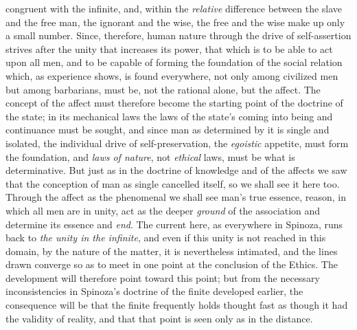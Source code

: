 \documentclass[12pt,a4paper,openany]{book}
\newcommand{\opage}[1]{\marginnote{\footnotesize\textit{[#1]}}}
\begin{document}
\opage{133}congruent with the infinite, and, within the \emph{relative} difference between the slave and the free man, the ignorant and the wise, the free and the wise make up only a small number. Since, therefore, human nature through the drive of self-assertion strives after the unity that increases its power, that which is to be able to act upon all men, and to be capable of forming the foundation of the social relation which, as experience shows, is found everywhere, not only among civilized men but among barbarians, must be, not the rational alone, but the affect. The concept of the affect must therefore become the starting point of the doctrine of the state; in its mechanical laws the laws of the state's coming into being and continuance must be sought, and since man as determined by it is single and isolated, the individual drive of self-preservation, the \emph{egoistic} appetite, must form the foundation, and \emph{laws of nature}, not \emph{ethical} laws, must be what is determinative. But just as in the doctrine of knowledge and of the affects we saw that the conception of man as single cancelled itself, so we shall see it here too. Through the affect as the phenomenal we shall see man's true essence, reason, in which all men are in unity, act as the deeper \emph{ground} of the association and determine its essence and \emph{end}. The current here, as everywhere in Spinoza, runs back to \emph{the unity in the infinite}, and even if this unity is not reached in this domain, by the nature of the matter, it is nevertheless intimated, and the lines drawn converge so as to meet in one point at the conclusion of the Ethics. The development will therefore point toward this point; but from the necessary inconsistencies in Spinoza's doctrine of the finite developed earlier, the consequence will be that the finite frequently holds thought fast as though it had the validity of reality, and that that point is seen only as in the distance.
\end{document}
